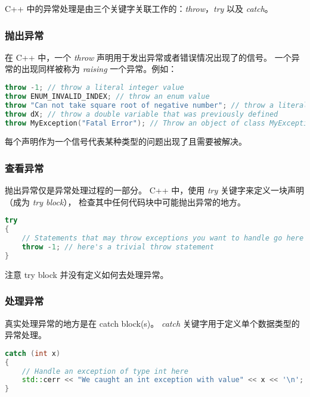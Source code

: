 \documentclass[../../LearnCpp.tex]{subfiles}
\begin{document}

C++ 中的异常处理是由三个关键字关联工作的：\textit{throw}，\textit{try} 以及 \textit{catch}。

\subsubsection*{抛出异常}

在 C++ 中，一个 \textit{throw} 声明用于发出异常或者错误情况出现了的信号。
一个异常的出现同样被称为 \textit{raising} 一个异常。例如：

\begin{lstlisting}[language=C++]
throw -1; // throw a literal integer value
throw ENUM_INVALID_INDEX; // throw an enum value
throw "Can not take square root of negative number"; // throw a literal C-style (const char*) string
throw dX; // throw a double variable that was previously defined
throw MyException("Fatal Error"); // Throw an object of class MyException
\end{lstlisting}

每个声明作为一个信号代表某种类型的问题出现了且需要被解决。

\subsubsection*{查看异常}

抛出异常仅是异常处理过程的一部分。
C++ 中，使用 \textit{try} 关键字来定义一块声明（成为 \textit{try block}），
检查其中任何代码块中可能抛出异常的地方。

\begin{lstlisting}[language=C++]
try
{
    // Statements that may throw exceptions you want to handle go here
    throw -1; // here's a trivial throw statement
}
\end{lstlisting}

注意 try block 并没有定义如何去处理异常。

\subsubsection*{处理异常}

真实处理异常的地方是在 catch block(s)。
\textit{catch} 关键字用于定义单个数据类型的异常处理。

\begin{lstlisting}[language=C++]
catch (int x)
{
    // Handle an exception of type int here
    std::cerr << "We caught an int exception with value" << x << '\n';
}
\end{lstlisting}
\end{document}
